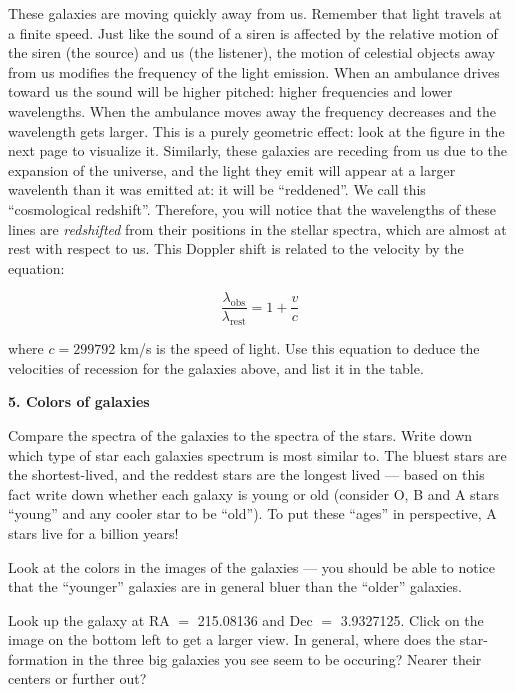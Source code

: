 \begin{figure*}[h]
\centerline{}
 \end{figure*}

\noindent These galaxies are moving quickly away from us. Remember 
that light travels at a finite speed.  Just like the sound of a siren
is affected by the relative motion of the siren (the source) and us
(the listener), the motion of celestial objects away from us modifies
the frequency of the light emission. When an ambulance drives toward
us the sound will be higher pitched: higher frequencies and lower
wavelengths. When the ambulance moves away the frequency decreases and
the wavelength gets larger. This is a purely geometric effect: look at
the figure in the next page to visualize it. Similarly, these galaxies
are receding from us due to the expansion of the universe, and the
light they emit will appear at a larger wavelenth than it was emitted
at: it will be ``reddened''. We call this ``cosmological redshift''.
Therefore, you will notice that the wavelengths of these lines are
{\it redshifted} from their positions in the stellar spectra, which
are almost at rest with respect to us. This Doppler shift is related
to the velocity by the equation:

\begin{equation}
\frac{\lambda_{\mathrm{obs}}}
{\lambda_{\mathrm{rest}}} = 1 + \frac{v}{c}
\end{equation}

\noindent where $c=299792$ km/s is the speed of light. Use this
equation to deduce the velocities of recession for the galaxies above,
and list it in the table.

\noindent
{\bf 5. Colors of galaxies}

\noindent Compare the spectra of the galaxies to the spectra of the
stars.  Write down which type of star each galaxies spectrum is most
similar to. The bluest stars are the shortest-lived, and the reddest
stars are the longest lived --- based on this fact write down whether
each galaxy is young or old (consider O, B and A stars ``young'' and
any cooler star to be ``old''). To put these ``ages'' in perspective,
A stars live for a billion years!

\noindent Look at the colors in the images of the galaxies --- you
should be able to notice that the ``younger'' galaxies are in general
bluer than the ``older'' galaxies.

\noindent Look up the galaxy at RA $=$ 215.08136 and Dec $=$
3.9327125. Click on the image on the bottom left to get a larger
view.  In general, where does the star-formation in the three big
galaxies you see seem to be occuring? Nearer their centers or further
out?


